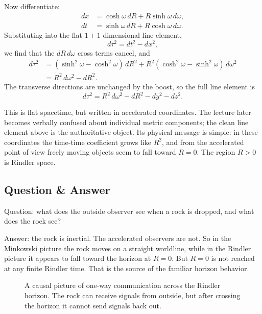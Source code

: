 Now differentiate:
\begin{align}
dx &= \cosh\omega\,dR + R\sinh\omega\,d\omega,\\
dt &= \sinh\omega\,dR + R\cosh\omega\,d\omega.
\end{align}
Substituting into the flat \(1+1\) dimensional line element,
\begin{equation}
d\tau^2 = dt^2-dx^2,
\end{equation}
we find that the \(dR\,d\omega\) cross terms cancel, and
\begin{align}
d\tau^2
&=
(\sinh^2\omega-\cosh^2\omega)\,dR^2
+
R^2(\cosh^2\omega-\sinh^2\omega)\,d\omega^2
\\
&=
R^2\,d\omega^2-dR^2.
\end{align}
The transverse directions are unchanged by the boost, so the full line element is
\begin{equation}
d\tau^2 = R^2\,d\omega^2 - dR^2 - dy^2 - dz^2.
\end{equation}

This is flat spacetime, but written in accelerated coordinates. The lecture later becomes verbally confused about individual metric components; the clean line element above is the authoritative object. Its physical message is simple: in these coordinates the time-time coefficient grows like \(R^2\), and from the accelerated point of view freely moving objects seem to fall toward \(R=0\). The region \(R>0\) is Rindler space.

\subsection{Question \& Answer}

Question: what does the outside observer see when a rock is dropped, and what does the rock see?

Answer: the rock is inertial. The accelerated observers are not. So in the Minkowski picture the rock moves on a straight worldline, while in the Rindler picture it appears to fall toward the horizon at \(R=0\). But \(R=0\) is not reached at any finite Rindler time. That is the source of the familiar horizon behavior.

\begin{figure}[t]
\centering
{}
\caption{A causal picture of one-way communication across the Rindler horizon. The rock can receive signals from outside, but after crossing the horizon it cannot send signals back out.}
\end{figure}

